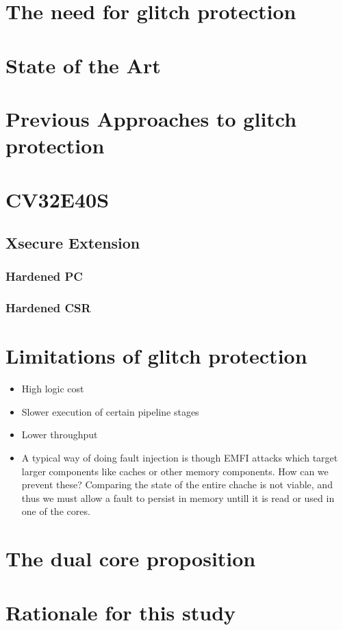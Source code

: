 \section{The need for glitch protection}
\section{State of the Art}
\section{Previous Approaches to glitch protection}
\section{CV32E40S}
\label{sec:cv32}
\subsection{Xsecure Extension}
\subsubsection{Hardened PC}
\subsubsection{Hardened CSR}
\section{Limitations of glitch protection}
\label{sec:limits}

\begin{itemize}
    \item High logic cost 
    \item Slower execution of certain pipeline stages
    \item Lower throughput 
    \item A typical way of doing fault injection is though EMFI attacks which target larger components like caches or other memory components.
    How can we prevent these? Comparing the state of the entire chache is not viable, and thus we must allow a fault to persist in 
    memory untill it is read or used in one of the cores.
\end{itemize}
\section{The dual core proposition}
\section{Rationale for this study}

